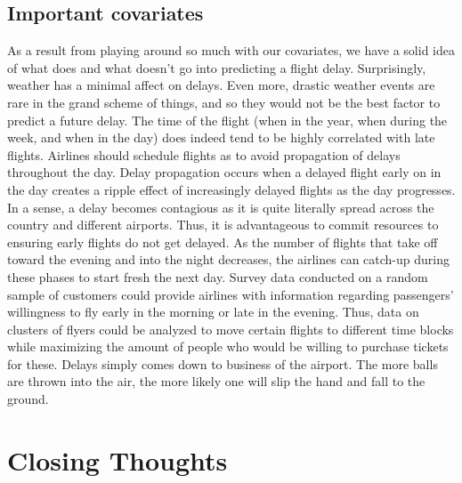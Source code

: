 \documentclass[12pt, a4paper, openany]{book}
\newcommand\tab[1][1cm]{\hspace*{#1}}
\begin{document}
	\section{Important covariates}
	\tab As a result from playing around so much with our covariates, we have a solid idea of what does and what doesn’t go into predicting a flight delay. Surprisingly, weather has a minimal affect on delays. Even more, drastic weather events are rare in the grand scheme of things, and so they would not be the best factor to predict a future delay. The time of the flight (when in the year, when during the week, and when in the day) does indeed tend to be highly correlated with late flights. Airlines should schedule flights as to avoid propagation of delays throughout the day. Delay propagation occurs when a delayed flight early on in the day creates a ripple effect of increasingly delayed flights as the day progresses. In a sense, a delay becomes contagious as it is quite literally spread across the country and different airports. Thus, it is advantageous to commit resources to ensuring early flights do not get delayed. As the number of flights that take off toward the evening and into the night decreases, the airlines can catch-up during these phases to start fresh the next day. Survey data conducted on a random sample of customers could provide airlines with information regarding passengers’ willingness to fly early in the morning or late in the evening. Thus, data on clusters of flyers could be analyzed to move certain flights to different time blocks while maximizing the amount of people who would be willing to purchase tickets for these. Delays simply comes down to business of the airport. The more balls are thrown into the air, the more likely one will slip the hand and fall to the ground. 
\chapter{Closing Thoughts}
\end{document}
